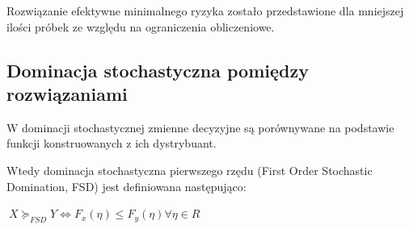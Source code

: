 \documentclass[11pt]{article} %
\begin{document}
Rozwiązanie efektywne minimalnego ryzyka zostało przedstawione dla mniejszej ilości próbek ze względu na ograniczenia obliczeniowe.

\subsection{Dominacja stochastyczna pomiędzy rozwiązaniami}

W dominacji stochastycznej zmienne decyzyjne są porównywane na podstawie funkcji konstruowanych z ich dystrybuant.

 Wtedy dominacja stochastyczna pierwszego rzędu (First Order Stochastic Domination, FSD) jest definiowana następująco:
 
$\ X \succeq_{FSD} Y \Leftrightarrow F_x(\eta ) \leq F_y(\eta) \forall \eta \in R $
\end{document}
